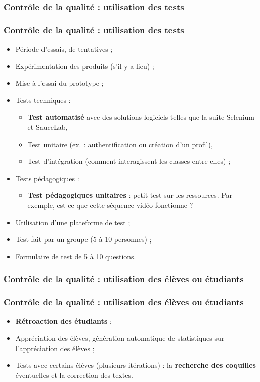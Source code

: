 					\subsubsection{Contrôle de la qualité : utilisation des tests} 
							\begin{frame}
							\frametitle{Contrôle de la qualité : utilisation des tests}
                        			
							\begin{itemize}
							\item Période d’essais, de tentatives ;
							\item Expérimentation des produits (s’il y a lieu) ;
							\item Mise à l’essai du  prototype ;
							\item Tests techniques :
								\begin{itemize}
								\item \textbf{Test automatisé } avec des solutions logiciels telles que la suite Selenium et SauceLab,
								\item Test unitaire (ex. : authentification ou création d’un profil),
								\item Test d’intégration (comment interagissent les classes entre elles) ;
								\end{itemize}
							\item Tests pédagogiques :
								\begin{itemize}
								\item \textbf{Test pédagogiques unitaires} :  petit test sur les ressources. Par exemple, est-ce que cette séquence vidéo fonctionne ?
								\end{itemize}
							\item Utilisation d’une plateforme de test ;
							\item Test fait par un groupe (5 à 10 personnes) ;
							\item Formulaire de test de 5 à 10 questions.
							\end{itemize}						
					\end{frame}
						
					\subsubsection{Contrôle de la qualité : utilisation des élèves ou étudiants} 
							\begin{frame}
							\frametitle{Contrôle de la qualité : utilisation des élèves ou étudiants}
                        			
							\begin{itemize}
							
							\item \textbf{Rétroaction des étudiants} ;
							\item Appréciation des élèves, génération automatique de statistiques sur l’appréciation des élèves  ;
							\item Tests avec certains élèves (plusieurs itérations) : la \textbf{recherche des coquilles }éventuelles et la correction des textes.										
							\end{itemize}						
					\end{frame}	
					
